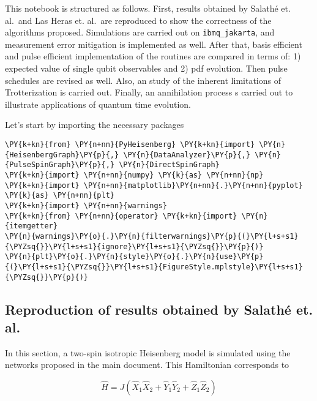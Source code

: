 This notebook is structured as follows. First, results obtained by
Salathé et. al.~and Las Heras et. al.~are reproduced to show the
correctness of the algorithms proposed. Simulations are carried out on
\texttt{ibmq\_jakarta}, and measurement error mitigation is implemented
as well. After that, basis efficient and pulse efficient implementation
of the routines are compared in terms of: 1) expected value of single
qubit observables and 2) pdf evolution. Then pulse schedules are revised
as well. Also, an study of the inherent limitations of Trotterization is
carried out. Finally, an annihilation process s carried out to
illustrate applications of quantum time evolution.

Let's start by importing the necessary packages

    \begin{tcolorbox}[breakable, size=fbox, boxrule=1pt, pad at break*=1mm,colback=cellbackground, colframe=cellborder]
\begin{Verbatim}[commandchars=\\\{\}]
\PY{k+kn}{from} \PY{n+nn}{PyHeisenberg} \PY{k+kn}{import} \PY{n}{HeisenbergGraph}\PY{p}{,} \PY{n}{DataAnalyzer}\PY{p}{,} \PY{n}{PulseSpinGraph}\PY{p}{,} \PY{n}{DirectSpinGraph}
\PY{k+kn}{import} \PY{n+nn}{numpy} \PY{k}{as} \PY{n+nn}{np}
\PY{k+kn}{import} \PY{n+nn}{matplotlib}\PY{n+nn}{.}\PY{n+nn}{pyplot} \PY{k}{as} \PY{n+nn}{plt}
\PY{k+kn}{import} \PY{n+nn}{warnings}
\PY{k+kn}{from} \PY{n+nn}{operator} \PY{k+kn}{import} \PY{n}{itemgetter}
\PY{n}{warnings}\PY{o}{.}\PY{n}{filterwarnings}\PY{p}{(}\PY{l+s+s1}{\PYZsq{}}\PY{l+s+s1}{ignore}\PY{l+s+s1}{\PYZsq{}}\PY{p}{)}
\PY{n}{plt}\PY{o}{.}\PY{n}{style}\PY{o}{.}\PY{n}{use}\PY{p}{(}\PY{l+s+s1}{\PYZsq{}}\PY{l+s+s1}{FigureStyle.mplstyle}\PY{l+s+s1}{\PYZsq{}}\PY{p}{)}
\end{Verbatim}
\end{tcolorbox}

    \hypertarget{reproduction-of-results-obtained-by-salathuxe9-et.-al.}{%
\subsection{Reproduction of results obtained by Salathé et.
al.}\label{reproduction-of-results-obtained-by-salathuxe9-et.-al.}}

In this section, a two-spin isotropic Heisenberg model is simulated
using the networks proposed in the main document. This Hamiltonian
corresponds to

\[
\hat{H} = J(\hat{X}_1\hat{X}_2 + \hat{Y}_1\hat{Y}_2 + \hat{Z}_1\hat{Z}_2)
\]

